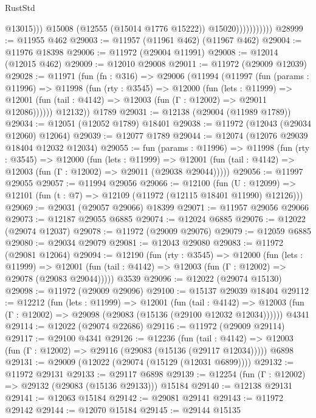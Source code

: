 \begin{lexlean}{RustStd}
\begin{coremodule}
                                @13015)))
                          @15008
                          (@12555 (@15014 @1776 @15222))
                          @15020)))))))))))
@28999 := @11955 @462
@29003 := @11957 (@11961 @462) (@11967 @462)
@29004 := @11976 @18398
@29006 := @11972 (@29004 @11991)
@29008 := @12014 (@12015 @462)
@29009 := @12010 @29008
@29011 := @11972 (@29009 @12039)
@29028 := @11971
    (fun (fn : @316) =>
    @29006
      (@11994
        (@11997
          (fun (params : @11996) =>
          @11998
            (fun (rty : @3545) =>
            @12000
              (fun (lets : @11999) =>
              @12001 (fun (tail : @4142) => @12003 (fun (Γ : @12002) => @29011 @12086))))))
        @12132))
    @1789
@29031 := @12138 (@29004 (@11989 @1789))
@29034 := @12051 (@12052 @1789) @18401
@29038 := @11972 (@12043 (@29034 @12060) @12064)
@29039 := @12077 @1789
@29044 := @12074 (@12076 @29039 @18404 @12032 @12034)
@29055 := fun (params : @11996) =>
  @11998
    (fun (rty : @3545) =>
    @12000
      (fun (lets : @11999) =>
      @12001 (fun (tail : @4142) => @12003 (fun (Γ : @12002) => @29011 (@29038 @29044)))))
@29056 := @11997 @29055
@29057 := @11994 @29056
@29066 := @12100
    (fun (U : @12099) => @12101 (fun (t : @7) => @12109 (@11972 (@12115 @18401 @11990) @12126)))
@29069 := @29031 (@29057 @29066) @18399
@29071 := @11957 @29056 @29066
@29073 := @12187 @29055 @6885
@29074 := @12024 @6885
@29076 := @12022 (@29074 @12037)
@29078 := @11972 (@29009 @29076)
@29079 := @12059 @6885
@29080 := @29034 @29079
@29081 := @12043 @29080
@29083 := @11972 (@29081 @12064)
@29094 := @12190
    (fun (rty : @3545) =>
    @12000
      (fun (lets : @11999) =>
      @12001 (fun (tail : @4142) => @12003 (fun (Γ : @12002) => @29078 (@29083 @29044)))))
    @3539
@29096 := @12022 (@29074 @15130)
@29098 := @11972 (@29009 @29096)
@29100 := @15137 @29039 @18404
@29112 := @12212
    (fun (lets : @11999) =>
    @12001
      (fun (tail : @4142) =>
      @12003 (fun (Γ : @12002) => @29098 (@29083 (@15136 (@29100 @12032 @12034))))))
    @4341
@29114 := @12022 (@29074 @22686)
@29116 := @11972 (@29009 @29114)
@29117 := @29100 @4341
@29126 := @12236
    (fun (tail : @4142) => @12003 (fun (Γ : @12002) => @29116 (@29083 (@15136 (@29117 @12034)))))
    @6898
@29131 := @29009 (@12022 (@29074 (@15129 (@12031 @6899))))
@29132 := @11972 @29131
@29133 := @29117 @6898
@29139 := @12254 (fun (Γ : @12002) => @29132 (@29083 (@15136 @29133))) @15184
@29140 := @12138 @29131
@29141 := @12063 @15184
@29142 := @29081 @29141
@29143 := @11972 @29142
@29144 := @12070 @15184
@29145 := @29144 @15135

\end{coremodule}
\end{lexlean}
